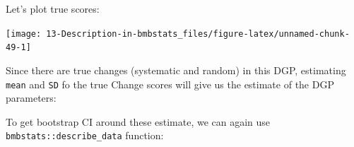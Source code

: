 \documentclass[
]{book}
\newenvironment{Shaded}{\begin{snugshade}}{\end{snugshade}}
\newcommand{\CommentTok}[1]{\textcolor[rgb]{0.56,0.35,0.01}{\textit{#1}}}
\newcommand{\DataTypeTok}[1]{\textcolor[rgb]{0.13,0.29,0.53}{#1}}
\newcommand{\DecValTok}[1]{\textcolor[rgb]{0.00,0.00,0.81}{#1}}
\newcommand{\KeywordTok}[1]{\textcolor[rgb]{0.13,0.29,0.53}{\textbf{#1}}}
\newcommand{\NormalTok}[1]{#1}
\newcommand{\OperatorTok}[1]{\textcolor[rgb]{0.81,0.36,0.00}{\textbf{#1}}}
\newcommand{\StringTok}[1]{\textcolor[rgb]{0.31,0.60,0.02}{#1}}
\begin{document}
Let's plot true scores:

\begin{Shaded}
\end{Shaded}

\begin{center}\texttt{[image: 13-Description-in-bmbstats\_files/figure-latex/unnamed-chunk-49-1]} \end{center}

Since there are true changes (systematic and random) in this DGP, estimating \texttt{mean} and \texttt{SD} fo the true Change scores will give us the estimate of the DGP parameters:

\begin{Shaded}
\end{Shaded}

\begin{Shaded}
\end{Shaded}

To get bootstrap CI around these estimate, we can again use \texttt{bmbstats::describe\_data} function:
\end{document}
